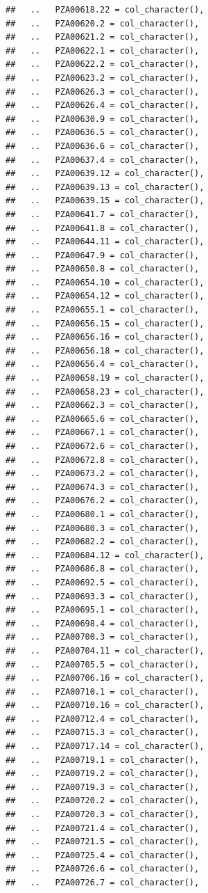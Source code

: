 \documentclass[
]{article}
\begin{document}
\begin{verbatim}
##   ..   PZA00618.22 = col_character(),
##   ..   PZA00620.2 = col_character(),
##   ..   PZA00621.2 = col_character(),
##   ..   PZA00622.1 = col_character(),
##   ..   PZA00622.2 = col_character(),
##   ..   PZA00623.2 = col_character(),
##   ..   PZA00626.3 = col_character(),
##   ..   PZA00626.4 = col_character(),
##   ..   PZA00630.9 = col_character(),
##   ..   PZA00636.5 = col_character(),
##   ..   PZA00636.6 = col_character(),
##   ..   PZA00637.4 = col_character(),
##   ..   PZA00639.12 = col_character(),
##   ..   PZA00639.13 = col_character(),
##   ..   PZA00639.15 = col_character(),
##   ..   PZA00641.7 = col_character(),
##   ..   PZA00641.8 = col_character(),
##   ..   PZA00644.11 = col_character(),
##   ..   PZA00647.9 = col_character(),
##   ..   PZA00650.8 = col_character(),
##   ..   PZA00654.10 = col_character(),
##   ..   PZA00654.12 = col_character(),
##   ..   PZA00655.1 = col_character(),
##   ..   PZA00656.15 = col_character(),
##   ..   PZA00656.16 = col_character(),
##   ..   PZA00656.18 = col_character(),
##   ..   PZA00656.4 = col_character(),
##   ..   PZA00658.19 = col_character(),
##   ..   PZA00658.23 = col_character(),
##   ..   PZA00662.3 = col_character(),
##   ..   PZA00665.6 = col_character(),
##   ..   PZA00667.1 = col_character(),
##   ..   PZA00672.6 = col_character(),
##   ..   PZA00672.8 = col_character(),
##   ..   PZA00673.2 = col_character(),
##   ..   PZA00674.3 = col_character(),
##   ..   PZA00676.2 = col_character(),
##   ..   PZA00680.1 = col_character(),
##   ..   PZA00680.3 = col_character(),
##   ..   PZA00682.2 = col_character(),
##   ..   PZA00684.12 = col_character(),
##   ..   PZA00686.8 = col_character(),
##   ..   PZA00692.5 = col_character(),
##   ..   PZA00693.3 = col_character(),
##   ..   PZA00695.1 = col_character(),
##   ..   PZA00698.4 = col_character(),
##   ..   PZA00700.3 = col_character(),
##   ..   PZA00704.11 = col_character(),
##   ..   PZA00705.5 = col_character(),
##   ..   PZA00706.16 = col_character(),
##   ..   PZA00710.1 = col_character(),
##   ..   PZA00710.16 = col_character(),
##   ..   PZA00712.4 = col_character(),
##   ..   PZA00715.3 = col_character(),
##   ..   PZA00717.14 = col_character(),
##   ..   PZA00719.1 = col_character(),
##   ..   PZA00719.2 = col_character(),
##   ..   PZA00719.3 = col_character(),
##   ..   PZA00720.2 = col_character(),
##   ..   PZA00720.3 = col_character(),
##   ..   PZA00721.4 = col_character(),
##   ..   PZA00721.5 = col_character(),
##   ..   PZA00725.4 = col_character(),
##   ..   PZA00726.6 = col_character(),
##   ..   PZA00726.7 = col_character(),

\end{verbatim}
\end{document}
